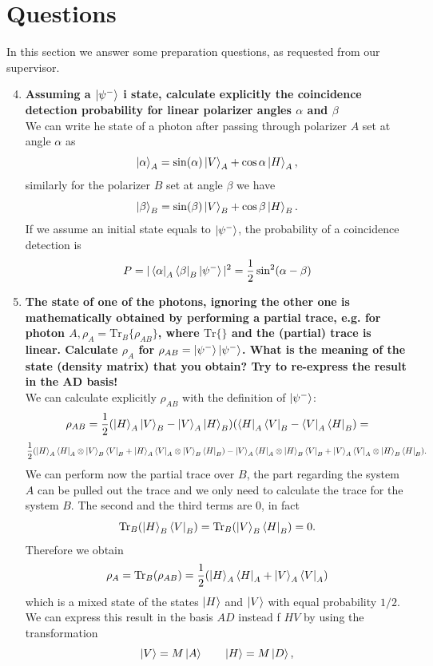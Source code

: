 \documentclass[a4paper,10pt]{article}
\begin{document}
\section{Questions}
In this section we answer some preparation questions, as requested from our supervisor.
\begin{enumerate}
\setcounter{enumi}{3}
\item \textbf{Assuming a $\ket{\psi^-}$ i state, calculate explicitly the coincidence detection probability for linear
polarizer angles $\alpha$ and $\beta$}\\ 
We can write he state of a photon after passing through polarizer $A$ set at angle $\alpha$ as
\[\ket{\alpha}_A = \sin(\alpha) \ket{V}_A + \cos{\alpha}\ket{H}_A,\] 
similarly for the polarizer $B$ set at angle $\beta$ we have \[\ket{\beta}_B = \sin(\beta) \ket{V}_B+ \cos{\beta}\ket{H}_B.\]
If we assume an initial state equals to $\ket{\psi^-}$, the probability of a coincidence detection is
\[P = |\bra{\alpha}_A\bra{\beta}_B \ket{\psi^-}|^2 = \frac{1}{2}\sin^2(\alpha-\beta)\]
\item \textbf{The state of one of the photons, ignoring the other one is mathematically obtained by performing a partial trace, e.g. for photon $A, \rho_A = \mathrm{Tr}_B\{\rho_{AB}\}$, where $\mathrm{Tr}\{\}$ and the (partial) trace is linear. Calculate $\rho_A$ for $\rho_{AB} = \ket{\psi^-}\ket{\psi^-}$. What is the meaning of the state (density matrix) that you obtain? Try to re-express the result in the AD basis!}\\
We can calculate explicitly $\rho_{AB}$ with the definition of $\ket{\psi^-}$:
\[\rho_{AB} = \frac{1}{2}(\ket{H}_A\ket{V}_B - \ket{V}_A\ket{H}_B)(\bra{H}_A\bra{V}_B - \bra{V}_A\bra{H}_B) = \]\[\frac{1}{2}(\ket{H}_A\bra{H}_A \otimes \ket{V}_B\bra{V}_B +\ket{H}_A\bra{V}_A \otimes \ket{V}_B\bra{H}_B)-\ket{V}_A\bra{H}_A \otimes \ket{H}_B\bra{V}_B + \ket{V}_A\bra{V}_A \otimes \ket{H}_B\bra{H}_B ).\]
We can perform now the partial trace over $B$, the part regarding the system $A$ can be pulled out the trace and we only need to calculate the trace for the system $B$. The second and the third terms are 0, in fact
\[\text{Tr}_B(\ket{H}_B\bra{V}_B) = \text{Tr}_B(\ket{V}_B\bra{H}_B) = 0. \]
Therefore we obtain
\[\rho_A = \text{Tr}_B(\rho_{AB}) = \frac{1}{2}(\ket{H}_A \bra{H}_A +\ket{V}_A \bra{V}_A )\]
which is a mixed state of the states $\ket{H}$ and $\ket{V}$ with equal probability $1/2$. We can express this result in the basis $AD$ instead f $HV$ by using the transformation
\[\ket{V} = M \ket{A} \qquad \ket{H} = M \ket{D},\]

\end{enumerate}
\end{document}
